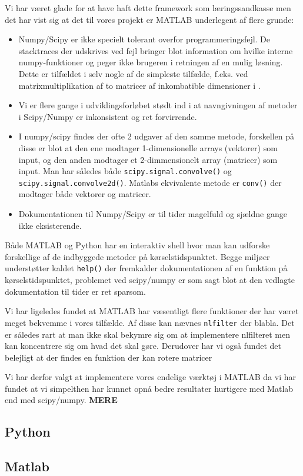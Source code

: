 Vi har været glade for at have haft dette framework som 
læringssandkasse men det har vist sig at det til vores projekt er MATLAB underlegent af flere grunde:
\begin{itemize}
	\item Numpy/Scipy er ikke specielt tolerant overfor programmeringsfejl. De stacktraces der udskrives ved fejl bringer blot information om hvilke interne numpy-funktioner og peger ikke brugeren i retningen af en mulig løsning. Dette er tilfældet i selv nogle af de simpleste tilfælde, f.eks. ved matrixmultiplikation af to matricer af inkombatible dimensioner i %
	.
	\item Vi er flere gange i udviklingsforløbet stødt ind i at navngivningen af metoder i Scipy/Numpy er inkonsistent og ret forvirrende. 
	\item I numpy/scipy findes der ofte 2 udgaver af den samme metode, forskellen på disse er blot at den ene modtager 1-dimensionelle arrays (vektorer) som input, og den anden modtager et 2-dimmensionelt array (matricer) som input. Man har således både \texttt{scipy.signal.convolve()} og \texttt{scipy.signal.convolve2d()}. Matlabs ekvivalente metode er \texttt{conv()} der modtager både vektorer og matricer.
	\item Dokumentationen til Numpy/Scipy er til tider magelfuld og sjældne gange ikke eksisterende. 
\end{itemize}

Både MATLAB og Python har en interaktiv shell hvor man kan udforske forskellige af de indbyggede metoder på kørselstidspunktet. Begge miljøer understøtter kaldet \texttt{help()} der fremkalder dokumentationen af en funktion på kørselstidspunktet, problemet ved scipy/numpy er som sagt blot at den vedlagte dokumentation til tider er ret sparsom.

Vi har ligeledes fundet at MATLAB har væsentligt flere funktioner der har været meget bekvemme i vores tilfælde. Af disse kan nævnes \texttt{nlfilter} der blabla. Det er således rart at man ikke skal bekymre sig om at implementere nlfilteret men kan koncentrere sig om hvad det skal gøre. 
Derudover har vi også fundet det belejligt at der findes en funktion der kan rotere matricer 

Vi har derfor valgt at implementere vores endelige værktøj i MATLAB da vi har fundet at vi simpelthen har kunnet opnå bedre resultater hurtigere med Matlab end med scipy/numpy. \bf{MERE} 
\subsection{Python}		%
\subsection{Matlab}		%
